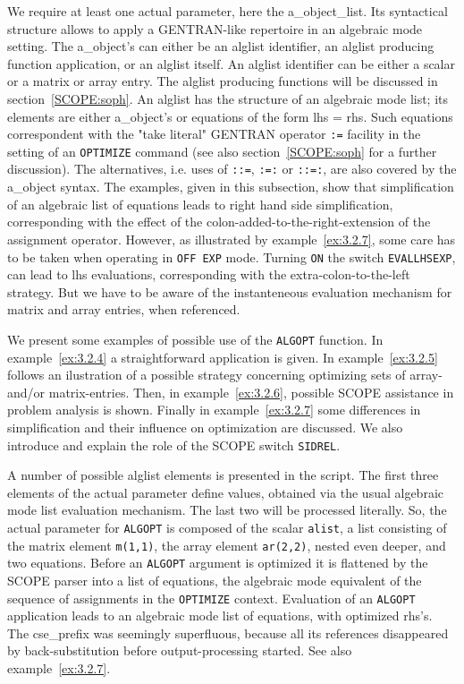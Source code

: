 We require at least one actual parameter, here the a\_object\_list. Its
syntactical structure allows to apply a GENTRAN-like repertoire in an 
algebraic mode setting. The a\_object's can
either be an alglist identifier, an alglist producing function application, 
or an alglist itself. An alglist identifier can be
either a scalar or a matrix or array entry. The alglist producing
functions will be discussed in section~\ref{SCOPE:soph}. An alglist has the
structure of an algebraic mode list; its elements are either a\_object's
or equations of the form lhs = rhs. Such equations correspondent
with the "take literal" GENTRAN operator {\tt :=} facility in the setting
of an {\tt OPTIMIZE} command (see also section~\ref{SCOPE:soph} for a further
discussion). The alternatives, i.e. uses of {\tt ::=}, {\tt :=:} or {\tt ::=:},
are also covered by the a\_object syntax.
The examples, given in this subsection, show that simplification of an algebraic
list of equations leads to right hand side simplification, corresponding with
the effect of the colon-added-to-the-right-extension of the assignment operator.
However, as illustrated by example~\ref{ex:3.2.7}, some care has to be taken
when operating in {\tt OFF EXP} mode.
Turning {\tt ON} the switch {\tt EVALLHSEXP}, can lead to lhs evaluations,
corresponding with the extra-colon-to-the-left strategy. But we have to
be aware of the instanteneous evaluation mechanism for matrix and 
array entries, when referenced. 

We present some examples of possible use of the {\tt ALGOPT} function.
In example~\ref{ex:3.2.4} a straightforward application is given.
In example~\ref{ex:3.2.5} follows an ilustration of a possible strategy 
concerning optimizing sets of array- and/or matrix-entries. Then, 
in example~\ref{ex:3.2.6}, possible SCOPE assistance in problem analysis is 
shown. Finally in example~\ref{ex:3.2.7}
some differences in simplification and their influence on optimization are
discussed. We also introduce and explain the role of the SCOPE 
switch {\tt SIDREL}.

\example\label{ex:3.2.4}

A number of possible alglist elements is presented in the script.
The first three elements of the actual parameter define values, obtained
via the usual algebraic mode list evaluation mechanism. The last two will be
processed literally. So, the actual parameter for {\tt ALGOPT} is composed 
of the scalar {\tt alist}, a list consisting of the matrix element {\tt m(1,1)},
the array element {\tt ar(2,2)}, nested even deeper, and two equations. Before 
an {\tt ALGOPT} argument is optimized it is flattened by the SCOPE parser 
into a list of equations, the algebraic mode equivalent of the sequence of
assignments in the {\tt OPTIMIZE} context. Evaluation of an {\tt ALGOPT}
application leads to an algebraic mode list of equations, with optimized rhs's.
The cse\_prefix was seemingly superfluous, because all its references
disappeared by back-substitution before output-processing started. See also
example~\ref{ex:3.2.7}.

